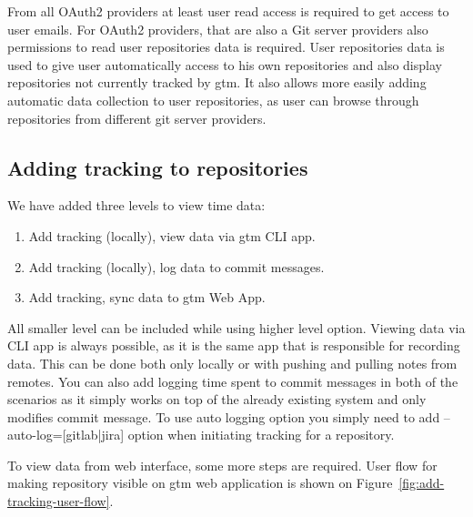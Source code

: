 From all OAuth2 providers at least user read access is required to get access to user emails.
For OAuth2 providers, that are also a Git server providers also permissions to read user repositories data is required.
User repositories data is used to give user automatically access to his own repositories and also display repositories
not currently tracked by gtm.
It also allows more easily adding automatic data collection to user repositories, as user can browse through
repositories from different git server providers.

\subsection{Adding tracking to repositories}\label{subsec:adding-tracking}
We have added three levels to view time data:
\begin{enumerate}
    \item Add tracking (locally), view data via gtm CLI app.
    \item Add tracking (locally), log data to commit messages.
    \item Add tracking, sync data to gtm Web App.
\end{enumerate}

All smaller level can be included while using higher level option.
Viewing data via CLI app is always possible, as it is the same app that is responsible for recording data.
This can be done both only locally or with pushing and pulling notes from remotes.
You can also add logging time spent to commit messages in both of the scenarios as it simply works on top of the already
existing system and only modifies commit message.
To use auto logging option you simply need to add --auto-log=[gitlab|jira] option when initiating tracking for a repository.

To view data from web interface, some more steps are required.
User flow for making repository visible on gtm web application is shown on Figure~\ref{fig:add-tracking-user-flow}.

